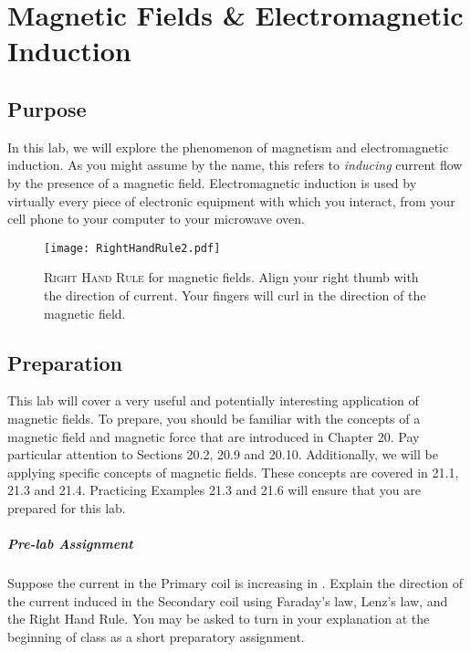 \chapter{Magnetic Fields \& \newline Electromagnetic Induction}

\section{Purpose}
In this lab, we will explore the phenomenon of magnetism and electromagnetic induction.  As you might assume by the name, this refers to \textit{inducing} current flow by the presence of a magnetic field.  Electromagnetic induction is used by virtually every piece of electronic equipment with which you interact, from your cell phone to your computer to your microwave oven.  

\begin{figure}[b!]
	\centering	\label{f:rhr}
	\texttt{[image: RightHandRule2.pdf]}
	\caption[Right hand rule for magnetic fields]{\textsc{Right Hand Rule} for magnetic fields.  Align your right thumb with the direction of current.  Your fingers will curl in the direction of the magnetic field.}
	\forcerectofloat
\end{figure}

\section{Preparation}
This lab will cover a very useful and potentially interesting application of magnetic fields.  To prepare, you should be familiar with the concepts of a magnetic field and magnetic force that are introduced in Chapter 20.  Pay particular attention to Sections 20.2, 20.9 and 20.10.  Additionally, we will be applying specific concepts of magnetic fields.  These concepts are covered in 21.1, 21.3 and 21.4.  Practicing Examples 21.3 and 21.6 will ensure that you are prepared for this lab.

\paragraph{Pre-lab Assignment}
Suppose the current in the Primary coil is increasing in .  Explain the direction of the current induced in the Secondary coil using Faraday's law, Lenz's law, and the Right Hand Rule.  You may be asked to turn in your explanation at the beginning of class as a short preparatory assignment.


